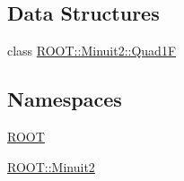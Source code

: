 \subsection*{Data Structures}
\begin{DoxyCompactItemize}
\item 
class \mbox{\hyperlink{classROOT_1_1Minuit2_1_1Quad1F}{R\+O\+O\+T\+::\+Minuit2\+::\+Quad1F}}
\end{DoxyCompactItemize}
\subsection*{Namespaces}
\begin{DoxyCompactItemize}
\item 
 \mbox{\hyperlink{namespaceROOT}{R\+O\+OT}}
\item 
 \mbox{\hyperlink{namespaceROOT_1_1Minuit2}{R\+O\+O\+T\+::\+Minuit2}}
\end{DoxyCompactItemize}
